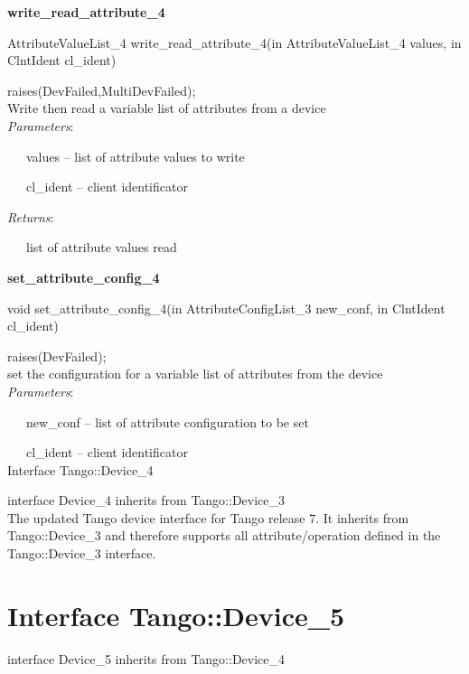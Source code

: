 \begin{flushleft}
\textbf{write\_read\_attribute\_4}
\par\end{flushleft}

AttributeValueList\_4 write\_read\_attribute\_4(in AttributeValueList\_4
values, in ClntIdent cl\_ident)

raises(DevFailed,MultiDevFailed);\\

Write then read a variable list of attributes from a device\\

\emph{Parameters}:

~~~values – list of attribute values to write

~~~cl\_ident – client identificator

\emph{Returns}:

~~~list of attribute values read\\

\begin{flushleft}
\textbf{set\_attribute\_config\_4}
\par\end{flushleft}

void set\_attribute\_config\_4(in AttributeConfigList\_3 new\_conf,
in ClntIdent cl\_ident)

raises(DevFailed);\\

set the configuration for a variable list of attributes from the device\\

\emph{Parameters}:

~~~new\_conf – list of attribute configuration to be set

~~~cl\_ident – client identificator\\
Interface Tango::Device\_4

interface Device\_4 inherits from Tango::Device\_3\\

The updated Tango device interface for Tango release 7. It inherits
from Tango::Device\_3 and therefore supports all attribute/operation
defined in the Tango::Device\_3 interface.

\section{Interface Tango::Device\_5}

interface Device\_5 inherits from Tango::Device\_4\\

